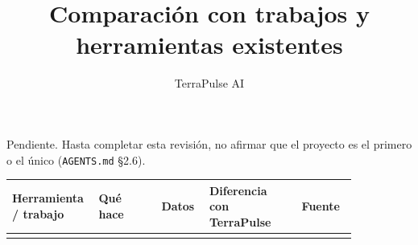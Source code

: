 \documentclass[11pt,a4paper]{article}
\title{Comparación con trabajos y herramientas existentes}
\author{TerraPulse AI}
\date{}
\begin{document}
\maketitle

\begin{nota}
Pendiente. Hasta completar esta revisión, no afirmar que el proyecto es el primero o el único
(\texttt{AGENTS.md} §2.6).
\end{nota}

\begin{longtable}{p{0.15\linewidth}p{0.17\linewidth}p{0.13\linewidth}p{0.25\linewidth}p{0.15\linewidth}}
\toprule
\textbf{Herramienta / trabajo} & \textbf{Qué hace} & \textbf{Datos} & \textbf{Diferencia con TerraPulse} & \textbf{Fuente} \\
\midrule
\endhead
 & & & & \\
\bottomrule
\end{longtable}
\end{document}
